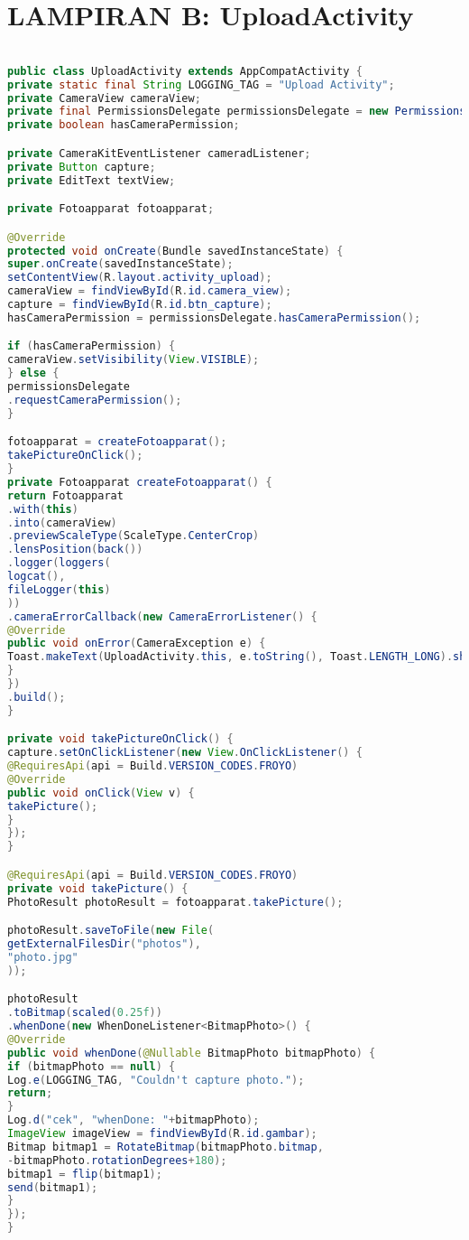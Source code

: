 \chapter{LAMPIRAN B: UploadActivity}
\begin{lstlisting}[language=Java, caption=Implementasi Fitur Upload, label=code:upload, firstnumber=53, breaklines]

public class UploadActivity extends AppCompatActivity {
private static final String LOGGING_TAG = "Upload Activity";
private CameraView cameraView;
private final PermissionsDelegate permissionsDelegate = new PermissionsDelegate(this);
private boolean hasCameraPermission;

private CameraKitEventListener cameradListener;
private Button capture;
private EditText textView;

private Fotoapparat fotoapparat;

@Override
protected void onCreate(Bundle savedInstanceState) {
super.onCreate(savedInstanceState);
setContentView(R.layout.activity_upload);
cameraView = findViewById(R.id.camera_view);
capture = findViewById(R.id.btn_capture);
hasCameraPermission = permissionsDelegate.hasCameraPermission();

if (hasCameraPermission) {
cameraView.setVisibility(View.VISIBLE);
} else {
permissionsDelegate
.requestCameraPermission();
}

fotoapparat = createFotoapparat();
takePictureOnClick();
}
private Fotoapparat createFotoapparat() {
return Fotoapparat
.with(this)
.into(cameraView)
.previewScaleType(ScaleType.CenterCrop)
.lensPosition(back())
.logger(loggers(
logcat(),
fileLogger(this)
))
.cameraErrorCallback(new CameraErrorListener() {
@Override
public void onError(CameraException e) {
Toast.makeText(UploadActivity.this, e.toString(), Toast.LENGTH_LONG).show();
}
})
.build();
}

private void takePictureOnClick() {
capture.setOnClickListener(new View.OnClickListener() {
@RequiresApi(api = Build.VERSION_CODES.FROYO)
@Override
public void onClick(View v) {
takePicture();
}
});
}

@RequiresApi(api = Build.VERSION_CODES.FROYO)
private void takePicture() {
PhotoResult photoResult = fotoapparat.takePicture();

photoResult.saveToFile(new File(
getExternalFilesDir("photos"),
"photo.jpg"
));

photoResult
.toBitmap(scaled(0.25f))
.whenDone(new WhenDoneListener<BitmapPhoto>() {
@Override
public void whenDone(@Nullable BitmapPhoto bitmapPhoto) {
if (bitmapPhoto == null) {
Log.e(LOGGING_TAG, "Couldn't capture photo.");
return;
}
Log.d("cek", "whenDone: "+bitmapPhoto);
ImageView imageView = findViewById(R.id.gambar);
Bitmap bitmap1 = RotateBitmap(bitmapPhoto.bitmap,
-bitmapPhoto.rotationDegrees+180);
bitmap1 = flip(bitmap1);
send(bitmap1);
}
});
}



\end{lstlisting}
